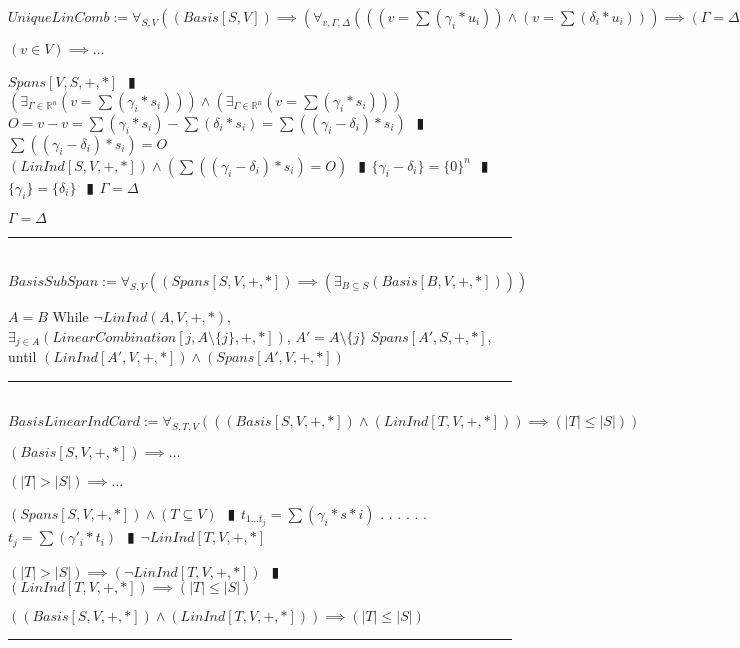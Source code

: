 \documentclass{book}
\newcommand{\abr}{:=}
\newcommand{\cont}{\phantom{.}. . .\phantom{.}}
\newcommand{\pipe}{$\phantom{(}\vrectangleblack\phantom{)}$}
\begin{document}
$UniqueLinComb \abr \forall_{S, V}((Basis[S, V]) \implies (\forall_{v, \Gamma, \Delta}(((v = \sum(\gamma_i * u_i)) \land (v = \sum(\delta_i * u_i))) \implies (\Gamma = \Delta))))$
\begin{enumerate}
  \lit $(v \in V) \implies \ldots$
  \begin{enumerate}
    \lit $Spans[V, S, +, *]$ \pipe $(\exists_{\Gamma \in \mathbb{R}^n}(v = \sum(\gamma_i * s_i))) \land (\exists_{\Gamma \in \mathbb{R}^n}(v = \sum(\gamma_i * s_i)))$
    \lit $O = v - v = \sum(\gamma_i * s_i) - \sum(\delta_i * s_i) = \sum((\gamma_i - \delta_i) * s_i)$ \pipe $\sum((\gamma_i - \delta_i) * s_i) = O$
    \lit $(LinInd[S, V, +, *]) \land (\sum((\gamma_i - \delta_i) * s_i) = O)$ \pipe $\{\gamma_i - \delta_i\} = \{0\}^n$ \pipe $\{\gamma_i\} = \{\delta_i\}$ \pipe $\Gamma = \Delta$
  \end{enumerate}
  \lit $\Gamma = \Delta$
\end{enumerate} \vspace{.75mm} \hrule \vspace{.75mm} \ \\ 

$BasisSubSpan \abr \forall_{S, V}((Spans[S, V, +, *]) \implies (\exists_{B \subseteq S}(Basis[B, V, +, *])))$
\begin{enumerate}
  \lit $A = B$
  \lit While $\lnot LinInd(A, V, +, *)$, $\exists_{j \in A}(LinearCombination[j, A \setminus \{j\}, +, *])$, $A' = A \setminus \{j\}$
  \lit $Spans[A', S, +, *]$, until $(LinInd[A', V, +, *]) \land (Spans[A', V, +, *])$
\end{enumerate} \vspace{.75mm} \hrule \vspace{.75mm} \ \\ 

$BasisLinearIndCard \abr \forall_{S, T, V}(((Basis[S, V, +, *]) \land (LinInd[T, V, +, *])) \implies (|T| \leq |S|))$
\begin{enumerate}
  \lit $(Basis[S, V, +, *]) \implies \ldots$
  \begin{enumerate}
      \lit $(|T| > |S|) \implies \ldots$
      \begin{enumerate}
        \lit $(Spans[S, V, +, *]) \land (T \subseteq V)$ \pipe $t_{1 \ldots t_j} = \sum(\gamma_i * s*i)$ \cont
        \lit \cont $t_j = \sum(\gamma'_i * t_i)$ \pipe $\lnot LinInd[T, V, +, *]$
      \end{enumerate}
      \lit $(|T| > |S|) \implies (\lnot LinInd[T, V, +, *])$ \pipe $(LinInd[T, V, +, *]) \implies (|T| \leq |S|)$
   \end{enumerate}
  \lit $((Basis[S, V, +, *]) \land (LinInd[T, V, +, *])) \implies (|T| \leq |S|)$
\end{enumerate} \vspace{.75mm} \hrule \vspace{.75mm} \ \\ 
\end{document}
